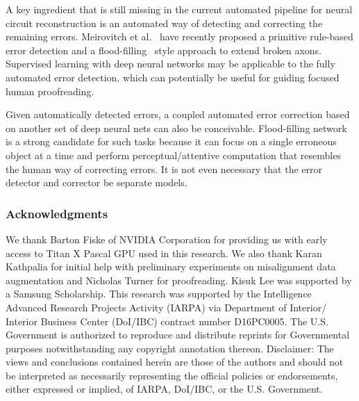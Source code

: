 \documentclass{article}
\begin{document}
A key ingredient that is still missing in the current automated pipeline for
neural circuit reconstruction is an automated way of detecting and correcting
the remaining errors. Meirovitch et al.~\cite{meirovitch2016} have recently
proposed a primitive rule-based error detection and a
flood-filling~\cite{januszewski2016} style approach to extend broken axons.
Supervised learning with deep neural networks may be applicable to the fully
automated error detection, which can potentially be useful for guiding focused
human proofreading.

Given automatically detected errors, a coupled automated error correction based
on another set of deep neural nets can also be conceivable. Flood-filling
network~\cite{januszewski2016} is a strong candidate for such tasks because it
can focus on a single erroneous object at a time and perform
perceptual/attentive computation that resembles the human way of correcting
errors. It is not even necessary that the error detector and corrector be
separate models.


\subsubsection*{Acknowledgments}

We thank Barton Fiske of NVIDIA Corporation for providing us with early access
to Titan X Pascal GPU used in this research. We also thank Karan Kathpalia for
initial help with preliminary experiments on misalignment data augmentation and
Nicholas Turner for proofreading. Kisuk Lee was supported by a Samsung
Scholarship. This research was supported by the Intelligence Advanced Research
Projects Activity (IARPA) via Department of Interior/ Interior Business Center
(DoI/IBC) contract number D16PC0005. The U.S. Government is authorized to
reproduce and distribute reprints for Governmental purposes notwithstanding any
copyright annotation thereon. Disclaimer: The views and conclusions contained
herein are those of the authors and should not be interpreted as necessarily
representing the official policies or endorsements, either expressed or implied,
of IARPA, DoI/IBC, or the U.S. Government.


\medskip
\small



% 
\end{document}
